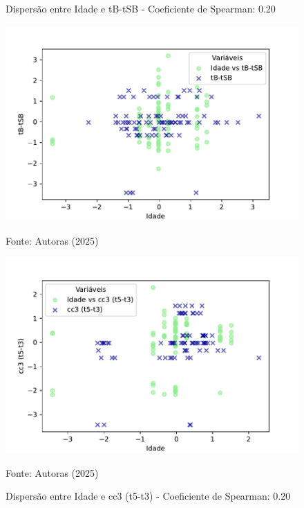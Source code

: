 \begin{figure}[h]
    \captionsetup{font=footnotesize, justification=centering, labelsep=period, position=above}
    \centering
    \begin{minipage}[b]{0.45\linewidth}
        \caption{Dispersão entre Idade e tB-tSB - Coeficiente de Spearman: 0.20}
        \label{fig:idade-tB-tSB}
        \centering
        \includegraphics[scale=0.35]{figuras/Spearman/idade-tB-tSB.pdf}
        \vspace{0.3cm}
        \begin{minipage}{\linewidth}
            \centering
            \scriptsize{Fonte: Autoras (2025)}
        \end{minipage}
    \end{minipage}
    \hspace{0.05\linewidth}
    \begin{minipage}[b]{0.45\linewidth}
        \caption{Dispersão entre Idade e cc3 (t5-t3) - Coeficiente de Spearman: 0.20}
        \label{fig:idade-cc3}
        \centering
        \includegraphics[scale=0.35]{figuras/Spearman/idade-cc3.pdf}
        \vspace{0.3cm}
        \begin{minipage}{\linewidth}
            \centering
            \scriptsize{Fonte: Autoras (2025)}
        \end{minipage}
    \end{minipage}
\end{figure}
\FloatBarrier

